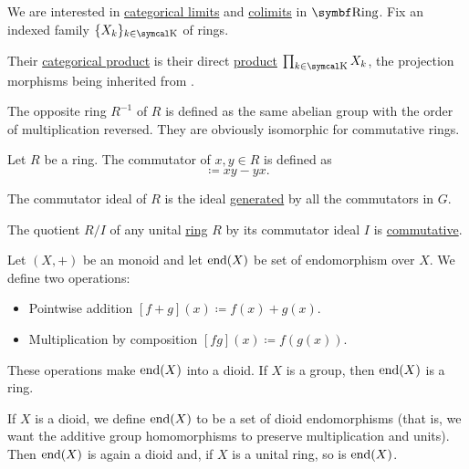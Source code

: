 \begin{proposition}\label{thm:ring_categorical_limits}
  We are interested in \hyperref[def:categorical_limit]{categorical limits} and \hyperref[def:categorical_colimit]{colimits} in \( \Cat{Ring} \). Fix an indexed family  \( \{ X_k \}_{k \in \CK} \) of rings.
  \begin{DefEnum}
     Their \hyperref[def:categorical_product]{categorical product} is their direct \hyperref[def:semiring_direct_product]{product} \( \prod_{k \in \CK} X_k \), the projection morphisms being inherited from .
  \end{DefEnum}
\end{proposition}

\begin{definition}\label{def:opposite_ring}
  The opposite ring \( R^{-1} \) of \( R \) is defined as the same abelian group with the order of multiplication reversed. They are obviously isomorphic for commutative rings.
\end{definition}

\begin{definition}\label{def:ring_commutator}
  Let \( R \) be a ring. The commutator of \( x, y \in R \) is defined as
  \begin{equation*}
    [x, y] \coloneqq xy - yx.
  \end{equation*}

  The commutator ideal of \( R \) is the ideal \hyperref[def:generated_ring_ideal]{generated} by all the commutators in \( G \).
\end{definition}

\begin{proposition}\label{thm:quotient_by_commutator_ideal}
  The quotient \( R / I \) of any unital \hyperref[def:semiring/unital_ring]{ring} \( R \) by its commutator ideal \( I \) is \hyperref[def:semiring/commutative_ring]{commutative}.
\end{proposition}

\begin{definition}\label{def:endomorphism_dioid}
  Let \( (X, +) \) be an monoid and let \( \operatorname{end}(X) \) be set of endomorphism over \( X \). We define two operations:
  \begin{itemize}
    \item Pointwise addition \( [f + g](x) \coloneqq f(x) + g(x) \).
    \item Multiplication by composition \( [fg](x) \coloneqq f(g(x)) \).
  \end{itemize}

  These operations make \( \operatorname{end}(X) \) into a dioid. If \( X \) is a group, then \( \operatorname{end}(X) \) is a ring.

  If \( X \) is a dioid, we define \( \operatorname{end}(X) \) to be a set of dioid endomorphisms (that is, we want the additive group homomorphisms to preserve multiplication and units). Then \( \operatorname{end}(X) \) is again a dioid and, if \( X \) is a unital ring, so is \( \operatorname{end}(X) \).
\end{definition}

